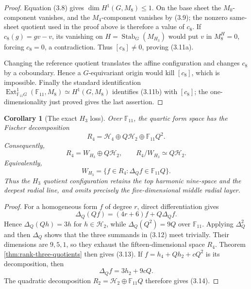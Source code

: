 \documentclass[11pt]{article}
\newtheorem{corollary}[theorem]{Corollary}
\theoremstyle{definition}
\theoremstyle{remark}
\newcommand{\F}{\mathbb{F}}
\begin{document}
\begin{proof}
Equation (3.8) gives \(\dim H^1(G,M_8)\leq1\).  On the base sheet the
\(M_0\)-component vanishes, and the \(M_4\)-component vanishes by (3.9);
the nonzero same-sheet quotient used in the proof above is therefore a
value of \(c_8\).  If \(c_8(g)=gv-v\), its vanishing on
\(H=\operatorname{Stab}_G(M_{H_3})\) would put \(v\) in \(M_8^H=0\),
forcing \(c_8=0\), a contradiction.  Thus \([c_8]\ne0\), proving
(3.11a).

Changing the reference quotient translates the affine configuration
and changes \(c_8\) by a coboundary.  Hence a \(G\)-equivariant origin
would kill \([c_8]\), which is impossible.  Finally the standard
identification
\(\operatorname{Ext}^1_{\F_{11}G}(\F_{11},M_8)\simeq H^1(G,M_8)\)
identifies (3.11b) with \([c_8]\); the one-dimensionality just proved
gives the last assertion.
\end{proof}

\begin{corollary}[The exact \(H_3\) loss]
\label{cor:h3-middle-layer}
Over \(\F_{11}\), the quartic form space has the Fischer decomposition
\[
 R_4=\mathcal H_4\oplus Q\mathcal H_2\oplus\F_{11}Q^2.
                                                               \tag{3.12}
\]
Consequently,
\[
 R_4=W_{H_3}\oplus Q\mathcal H_2,\qquad
 R_4/W_{H_3}\simeq Q\mathcal H_2.                              \tag{3.13}
\]
Equivalently,
\[
 W_{H_3}
 =\{f\in R_4:\Delta_Qf\in\F_{11}Q\}.                           \tag{3.14}
\]
Thus the \(H_3\) quotient configuration retains the top harmonic
nine-space and the deepest radial line, and omits precisely the
five-dimensional middle radial layer.
\end{corollary}

\begin{proof}
For a homogeneous form \(f\) of degree \(r\), direct differentiation
gives
\[
 \Delta_Q(Qf)=(4r+6)f+Q\Delta_Qf.                              \tag{3.15}
\]
Hence \(\Delta_Q(Qh)=3h\) for \(h\in\mathcal H_2\), while
\(\Delta_Q(Q^2)=9Q\) over \(\F_{11}\).  Applying
\(\Delta_Q^2\) and then \(\Delta_Q\) shows that the three summands in
(3.12) meet trivially.  Their dimensions are \(9,5,1\), so they exhaust
the fifteen-dimensional space \(R_4\).  Theorem
\ref{thm:rank-three-quotients} then gives (3.13).  If
\(f=h_4+Qh_2+cQ^2\) is its decomposition, then
\[
 \Delta_Qf=3h_2+9cQ.
\]
The quadratic decomposition \(R_2=\mathcal H_2\oplus\F_{11}Q\)
therefore gives (3.14).
\end{proof}
\end{document}
